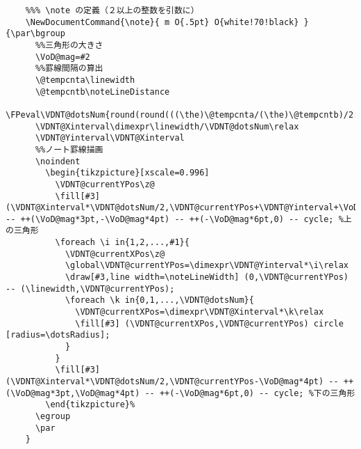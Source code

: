 \documentclass[a4paper,12pt]{article}
\begin{document}
\begin{lstlisting}
    %%% \note の定義（２以上の整数を引数に）
    \NewDocumentCommand{\note}{ m O{.5pt} O{white!70!black} }{\par\bgroup
      %%三角形の大きさ
      \VoD@mag=#2
      %%罫線間隔の算出
      \@tempcnta\linewidth
      \@tempcntb\noteLineDistance
      \FPeval\VDNT@dotsNum{round(round(((\the)\@tempcnta/(\the)\@tempcntb)/2:0)*2:0)}%
      \VDNT@Xinterval\dimexpr\linewidth/\VDNT@dotsNum\relax
      \VDNT@Yinterval\VDNT@Xinterval
      %%ノート罫線描画
      \noindent
        \begin{tikzpicture}[xscale=0.996]
          \VDNT@currentYPos\z@
          \fill[#3] (\VDNT@Xinterval*\VDNT@dotsNum/2,\VDNT@currentYPos+\VDNT@Yinterval+\VoD@mag*4pt) -- ++(\VoD@mag*3pt,-\VoD@mag*4pt) -- ++(-\VoD@mag*6pt,0) -- cycle; %上の三角形
          \foreach \i in{1,2,...,#1}{ 
            \VDNT@currentXPos\z@
            \global\VDNT@currentYPos=\dimexpr\VDNT@Yinterval*\i\relax
            \draw[#3,line width=\noteLineWidth] (0,\VDNT@currentYPos) -- (\linewidth,\VDNT@currentYPos);
            \foreach \k in{0,1,...,\VDNT@dotsNum}{
              \VDNT@currentXPos=\dimexpr\VDNT@Xinterval*\k\relax
              \fill[#3] (\VDNT@currentXPos,\VDNT@currentYPos) circle [radius=\dotsRadius];
            }
          }
          \fill[#3] (\VDNT@Xinterval*\VDNT@dotsNum/2,\VDNT@currentYPos-\VoD@mag*4pt) -- ++(\VoD@mag*3pt,\VoD@mag*4pt) -- ++(-\VoD@mag*6pt,0) -- cycle; %下の三角形
        \end{tikzpicture}%
      \egroup
      \par
    }



\end{lstlisting}
\end{document}
